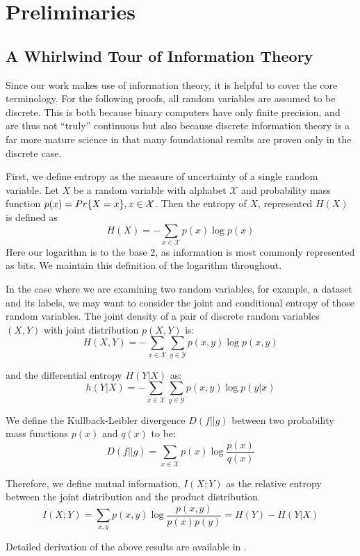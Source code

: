 \chapter{Preliminaries}
\label{chap:two}

\section{A Whirlwind Tour of Information Theory} 
Since our work makes use of information theory, it is helpful to cover the core terminology.
For the following proofs, all random variables are assumed to be discrete. 
This is both because binary computers have only finite precision, and are thus not ``truly'' continuous but also because discrete information theory is a far more mature science in that many foundational results are proven only in the discrete case.

First, we define entropy as the measure of uncertainty of a single random variable.
Let $X$ be a random variable with alphabet $\mathcal{X}$ and probability mass function $p(x) = \\Pr\{X = x\}, x \in \mathcal{X}$.
Then the entropy of $X$, represented $H(X)$ is defined as
$$H(X) = -\sum_{x \in \mathcal{X}} p(x) \log{p(x)}$$
Here our logarithm is to the base 2, as information is most commonly represented as bits.
We maintain this definition of the logarithm throughout. 

In the case where we are examining two random variables, for example, a dataset and its labels, we may want to consider the joint and conditional entropy of those random variables.
The joint density of a pair of discrete random variables $(X, Y)$ with joint distribution $p(X, Y)$ is:
$$H(X, Y) = - \sum_{x \in \mathcal{X}} \sum_{y \in \mathcal{Y}} p(x, y) \log{p(x, y)}$$

and the differential entropy $H(Y | X)$ as:
$$ h(Y|X) = -\sum_{x \in \mathcal{X}} \sum_{y \in \mathcal{Y}} p(x, y) \log{p(y|x)}$$

We define the Kullback-Leibler divergence $D(f||g)$ between two probability mass functions $p(x)$ and $q(x)$ to be:
$$D(f||g) = \sum_{x \in \mathcal{X}} p(x) \log{\frac{p(x)}{q(x)}}$$

Therefore, we define mutual information, $I(X; Y)$ as the relative entropy between the joint distribution and the product distribution.
$$I(X; Y) = \sum_{x, y} p(x, y) \log{\frac{p(x,y)}{p(x) p(y)}} = H(Y) - H(Y|X)$$

Detailed derivation of the above results are available in \cite{coverthomas2006}.

